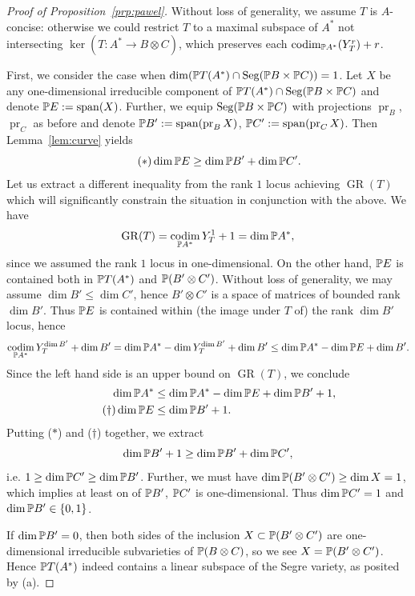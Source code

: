 \documentclass[a4paper,10pt]{article}
\def\set#1{\left\{#1\right\}}
\DeclareMathOperator{\codim}{codim}
\DeclareMathOperator{\Seg}{Seg}
\DeclareMathOperator{\GR}{GR}
\DeclareMathOperator{\pr}{pr}
\DeclareMathOperator{\spn}{span}
\theoremstyle{definition}
\theoremstyle{remark}
\begin{document}
\begin{proof}[Proof of Proposition~\ref{prp:pawel}]
    Without loss of generality, we assume $T$ is $A$-concise: otherwise we could restrict $T$ to a maximal subspace of $A^*$ not intersecting $\ker(T:A^*\to B\otimes C)$, which preserves each $\codim_{\pe A^*}(Y^r_T)+r$.

    First, we consider the case when $\dim(\pe T(A^*)\cap \Seg(\pe B\times \pe C))=1$. Let $X$ be any one-dimensional irreducible component of $\pe T(A^*)\cap \Seg(\pe B\times \pe C)$ and denote $\pe E:=\spn(X)$. Further, we equip $\Seg(\pe B\times\pe C)$ with projections $\pr_B$, $\pr_C$ as before and denote $\pe B':=\spn(\pr_B X)$, $\pe C' := \spn(\pr_C X)$. Then Lemma~\ref{lem:curve} yields
    \begin{equation}
        \tag{$\ast$}
        \dim\pe E \geq \dim\pe B' + \dim\pe C'.
    \end{equation}
    Let us extract a different inequality from the rank $1$ locus achieving $\GR(T)$ which will significantly constrain the situation in conjunction with the above. We have
    \[
        \GR(T) = \codim_{\pe A^*} Y^1_T + 1 = \dim\pe A^*,
    \]
    since we assumed the rank $1$ locus in one-dimensional. On the other hand, $\pe E$ is contained both in $\pe T(A^*)$ and $\pe(B'\otimes C')$. Without loss of generality, we may assume $\dim B'\leq \dim C'$, hence $B'\otimes C'$ is a space of matrices of bounded rank $\dim B'$. Thus $\pe E$ is contained within (the image under $T$ of) the rank $\dim B'$ locus, hence
    \[
        \codim_{\pe A^*}Y^{\dim B'}_T+\dim B' = \dim\pe A^* - \dim Y^{\dim B'}_T +\dim B' \leq \dim \pe A^* -\dim\pe E +\dim B'.
    \]
    Since the left hand side is an upper bound on $\GR(T)$, we conclude
    \begin{align}
        \nonumber
        \dim \pe A^* &\leq \dim\pe A^* - \dim\pe E + \dim \pe B' + 1,\\
        \tag{$\dag$}
        \dim \pe E &\leq \dim\pe B'+1.
    \end{align}
    Putting ($\ast$) and ($\dag$) together, we extract
    \[
        \dim\pe B'+1 \geq \dim\pe B'+\dim\pe C',
    \]
    i.e. $1\geq\dim\pe C'\geq\dim\pe B'$. Further, we must have $\dim\pe(B'\otimes C')\geq\dim X = 1$, which implies at least on of $\pe B'$, $\pe C'$ is one-dimensional. Thus $\dim\pe C' = 1$ and $\dim\pe B'\in\set{0,1}$.

    If $\dim\pe B' = 0$, then both sides of the inclusion $X\subset\pe (B'\otimes C')$ are one-dimensional irreducible subvarieties of $\pe(B\otimes C)$, so we see $X=\pe(B'\otimes C')$. Hence $\pe T(A^*)$ indeed contains a linear subspace of the Segre variety, as posited by (a).


\end{proof}
\end{document}

